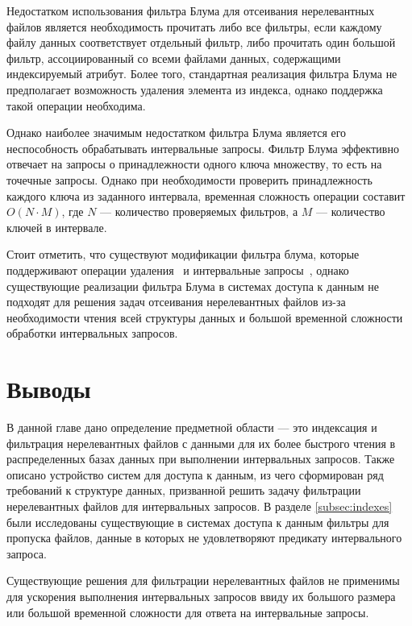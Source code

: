 Недостатком использования фильтра Блума для отсеивания нерелевантных файлов является необходимость прочитать либо все фильтры, если каждому файлу данных соответствует отдельный фильтр, либо прочитать один большой фильтр, ассоциированный со всеми файлами данных, содержащими индексируемый атрибут. Более того, стандартная реализация фильтра Блума не предполагает возможность удаления элемента из индекса, однако поддержка такой операции необходима.

Однако наиболее значимым недостатком фильтра Блума является его неспособность обрабатывать интервальные запросы. Фильтр Блума эффективно отвечает на запросы о принадлежности одного ключа множеству, то есть на точечные запросы. Однако при необходимости проверить принадлежность каждого ключа из заданного интервала, временная сложность операции составит $O(N \cdot M)$, где $N$ --- количество проверяемых фильтров, а $M$ --- количество ключей в интервале. 

Стоит отметить, что существуют модификации фильтра блума, которые поддерживают операции удаления~\cite{Counting_bloom_filter} и интервальные запросы~\cite{Count_min_sketch}, однако существующие реализации фильтра Блума в системах доступа к данным не подходят для решения задач отсеивания нерелевантных файлов из-за необходимости чтения всей структуры данных и большой временной сложности обработки интервальных запросов.


\newpage
\section*{Выводы}

В данной главе дано определение предметной области --- это индексация и фильтрация нерелевантных файлов с данными для их более быстрого чтения в распределенных базах данных при выполнении интервальных запросов. Также описано устройство систем для доступа к данным, из чего сформирован ряд требований к структуре данных, призванной решить задачу фильтрации нерелевантных файлов для интервальных запросов. В разделе \ref{subsec:indexes} были исследованы существующие в системах доступа к данным фильтры для пропуска файлов, данные в которых не удовлетворяют предикату интервального запроса.

Существующие решения для фильтрации нерелевантных файлов не применимы для ускорения выполнения интервальных запросов ввиду их большого размера или большой временной сложности для ответа на интервальные запросы.
